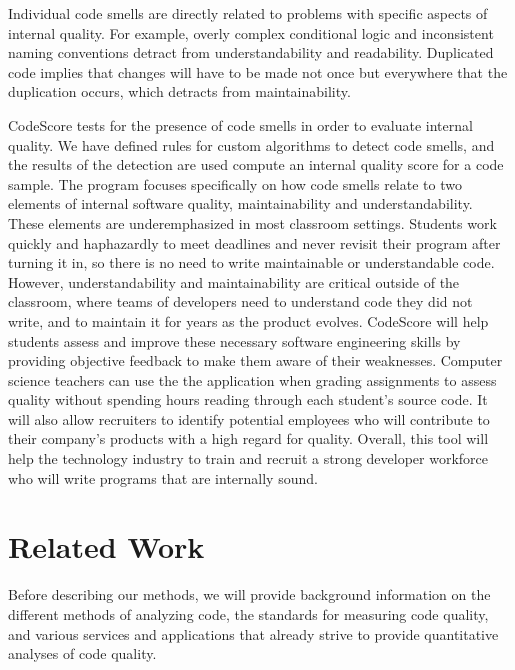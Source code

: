 \documentclass{sig-alternate}
\begin{document}
Individual code smells are directly related to problems with specific aspects of
internal quality. For example, overly complex conditional logic and inconsistent
naming conventions detract from understandability and readability. Duplicated
code implies that changes will have to be made not once but everywhere that the
duplication occurs, which detracts from maintainability. 

CodeScore tests for the presence of code smells in order to evaluate internal
quality. We have defined rules for custom algorithms to detect code smells, and
the results of the detection are used compute an internal quality score for a
code sample. The program focuses specifically on how code smells relate to two
elements of internal software quality, maintainability and understandability.
These elements are underemphasized in most classroom settings. Students work
quickly and haphazardly to meet deadlines and never revisit their program after
turning it in, so there is no need to write maintainable or understandable code.
However, understandability and maintainability are critical outside of the
classroom, where teams of developers need to understand code they did not write,
and to maintain it for years as the product evolves. CodeScore will help
students assess and improve these necessary software engineering skills by
providing objective feedback to make them aware of their weaknesses. Computer
science teachers can use the the application when grading assignments to assess
quality without spending hours reading through each student's source code. It
will also allow recruiters to identify potential employees who will contribute
to their company's products with a high regard for quality. Overall, this tool
will help the technology industry to train and recruit a strong developer
workforce who will write programs that are internally sound. 

\section{Related Work}
\label{sec:related_work}
Before describing our methods, we will provide background information
on the different methods of analyzing code, the standards for measuring code
quality, and various services and applications that already strive to provide
quantitative analyses of code quality.
\end{document}
